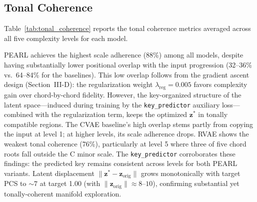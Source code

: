 \documentclass[conference]{IEEEtran}
\begin{document}
\subsection{Tonal Coherence}

Table~\ref{tab:tonal_coherence} reports the tonal coherence metrics averaged across all five complexity levels for each model.

\begin{table}[h]
\centering
\caption{Tonal coherence (mean across 5 levels). Scale = \% roots in the key's scale, Overlap = \% positional match with input, Quality = \% preserved maj/min quality. Input key: C minor.}
\label{tab:tonal_coherence}
\end{table}

PEARL achieves the highest scale adherence (88\%) among all models, despite having substantially lower positional overlap with the input progression (32--36\% vs.\ 64--84\% for the baselines). This low overlap follows from the gradient ascent design (Section~III-D): the regularization weight $\lambda_{\text{reg}} = 0.005$ favors complexity gain over chord-by-chord fidelity. However, the key-organized structure of the latent space---induced during training by the \texttt{key\_predictor} auxiliary loss---combined with the regularization term, keeps the optimized $\mathbf{z}^*$ in tonally compatible regions. The CVAE baseline's high overlap stems partly from copying the input at level 1; at higher levels, its scale adherence drops. RVAE shows the weakest tonal coherence (76\%), particularly at level 5 where three of five chord roots fall outside the C minor scale. The \texttt{key\_predictor} corroborates these findings: the predicted key remains consistent across levels for both PEARL variants. Latent displacement $\|\mathbf{z}^* - \mathbf{z}_{\text{orig}}\|$ grows monotonically with target PCS to $\sim 7$ at target 1.00 (with $\|\mathbf{z}_{\text{orig}}\| \approx 8$--$10$), confirming substantial yet tonally-coherent manifold exploration.
\end{document}
